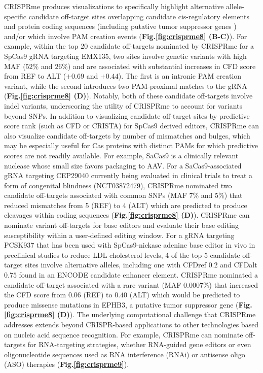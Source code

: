 \documentclass[a4paper, titlepage, openright]{book}
\begin{document}
CRISPRme produces visualizations to specifically highlight alternative allele-specific candidate off-target sites overlapping candidate cis-regulatory elements and protein coding sequences (including putative tumor suppressor genes \citep{zhao2016tsgene}) and/or which involve PAM creation events (\textbf{Fig.\ref{fig:crisprme8} (B-C)}). For example, within the top 20 candidate off-targets nominated by CRISPRme for a SpCas9 gRNA targeting EMX135, two sites involve genetic variants with high MAF ($52\%$ and $26\%$) and are associated with substantial increases in CFD score from REF to ALT ($+0.69$ and $+0.44$). The first is an intronic PAM creation variant, while the second introduces two PAM-proximal matches to the gRNA (\textbf{Fig.\ref{fig:crisprme8} (D)}). Notably, both of these candidate off-targets involve indel variants, underscoring the utility of CRISPRme to account for variants beyond SNPs. In addition to visualizing candidate off-target sites by predictive score rank (such as CFD or CRISTA) for SpCas9 derived editors, CRISPRme can also visualize candidate off-targets by number of mismatches and bulges, which may be especially useful for Cas proteins with distinct PAMs for which predictive scores are not readily available. For example, SaCas9 is a clinically relevant nuclease whose small size favors packaging to AAV. For a SaCas9-associated gRNA targeting CEP29040 currently being evaluated in clinical trials to treat a form of congenital blindness (NCT03872479), CRISPRme nominated two candidate off-targets associated with common SNPs (MAF $7\%$ and $5\%$) that reduced mismatches from 5 (REF) to 4 (ALT) which are predicted to produce cleavages within coding sequences (\textbf{Fig.\ref{fig:crisprme8} (D)}). CRISPRme can nominate variant off-targets for base editors and evaluate their base editing susceptibility within a user-defined editing window. For a gRNA targeting PCSK937 that has been used with SpCas9-nickase adenine base editor in vivo in preclinical studies to reduce LDL cholesterol levels, 4 of the top 5 candidate off-target sites involve alternative alleles, including one with CFDref $0.2$ and CFDalt $0.75$ found in an ENCODE candidate enhancer element. CRISPRme nominated a candidate off-target associated with a rare variant (MAF $0.0007\%$) that increased the CFD score from $0.06$ (REF) to $0.40$ (ALT) which would be predicted to produce missense mutations in EPHB3, a putative tumor suppressor gene (\textbf{Fig.\ref{fig:crisprme8} (D)}). The underlying computational challenge that CRISPRme addresses extends beyond CRISPR-based applications to other technologies based on nucleic acid sequence recognition. For example, CRISPRme can nominate off-targets for RNA-targeting strategies, whether RNA-guided gene editors or even oligonucleotide sequences used as RNA interference (RNAi) or antisense oligo (ASO) therapies (\textbf{Fig.\ref{fig:crisprme9}}). 
\end{document}
